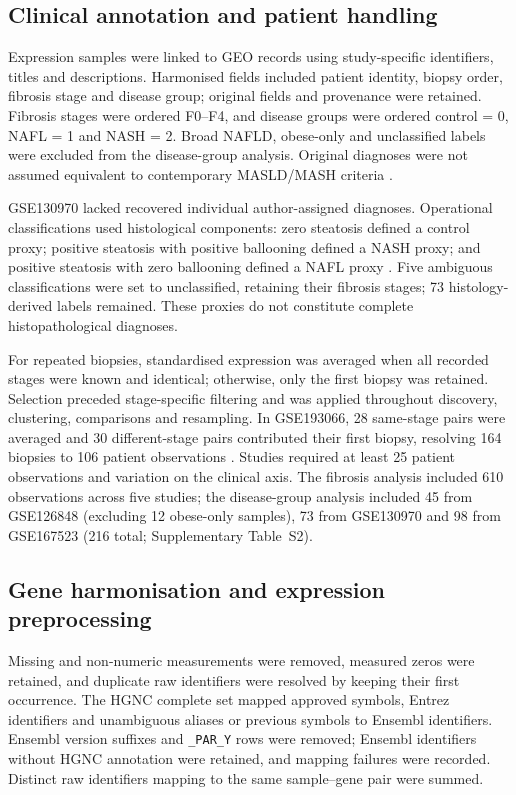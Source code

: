 \documentclass[11pt,a4paper]{article}
\begin{document}
\subsection*{Clinical annotation and patient handling}
Expression samples were linked to GEO records using study-specific identifiers, titles and descriptions. Harmonised fields included patient identity, biopsy order, fibrosis stage and disease group; original fields and provenance were retained. Fibrosis stages were ordered F0--F4, and disease groups were ordered control = 0, NAFL = 1 and NASH = 2. Broad NAFLD, obese-only and unclassified labels were excluded from the disease-group analysis. Original diagnoses were not assumed equivalent to contemporary MASLD/MASH criteria \cite{ref3}.

GSE130970 lacked recovered individual author-assigned diagnoses. Operational classifications used histological components: zero steatosis defined a control proxy; positive steatosis with positive ballooning defined a NASH proxy; and positive steatosis with zero ballooning defined a NAFL proxy \cite{ref4}. Five ambiguous classifications were set to unclassified, retaining their fibrosis stages; 73 histology-derived labels remained. These proxies do not constitute complete histopathological diagnoses.

For repeated biopsies, standardised expression was averaged when all recorded stages were known and identical; otherwise, only the first biopsy was retained. Selection preceded stage-specific filtering and was applied throughout discovery, clustering, comparisons and resampling. In GSE193066, 28 same-stage pairs were averaged and 30 different-stage pairs contributed their first biopsy, resolving 164 biopsies to 106 patient observations \cite{ref10}. Studies required at least 25 patient observations and variation on the clinical axis. The fibrosis analysis included 610 observations across five studies; the disease-group analysis included 45 from GSE126848 (excluding 12 obese-only samples), 73 from GSE130970 and 98 from GSE167523 (216 total; Supplementary Table~S2).

\subsection*{Gene harmonisation and expression preprocessing}
Missing and non-numeric measurements were removed, measured zeros were retained, and duplicate raw identifiers were resolved by keeping their first occurrence. The HGNC complete set mapped approved symbols, Entrez identifiers and unambiguous aliases or previous symbols to Ensembl identifiers. Ensembl version suffixes and \texttt{\_PAR\_Y} rows were removed; Ensembl identifiers without HGNC annotation were retained, and mapping failures were recorded. Distinct raw identifiers mapping to the same sample--gene pair were summed.
\end{document}

